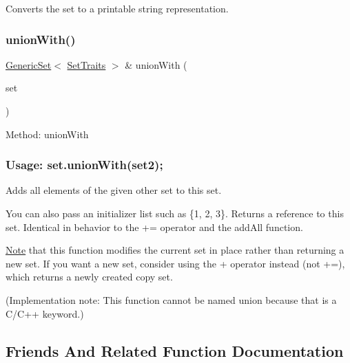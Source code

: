 Converts the set to a printable string representation. 

\mbox{\label{classstanfordcpplib_1_1collections_1_1GenericSet_affa3b4d177e1794dbb3e6a414a5ec2b3}} 
\subsubsection{\texorpdfstring{union\+With()}{unionWith()}}
{\footnotesize\ttfamily \mbox{\hyperlink{classstanfordcpplib_1_1collections_1_1GenericSet}{Generic\+Set}}$<$ \mbox{\hyperlink{structstanfordcpplib_1_1collections_1_1SetTraits}{Set\+Traits}} $>$ \& union\+With (\begin{DoxyParamCaption}\item[{const \mbox{\hyperlink{classstanfordcpplib_1_1collections_1_1GenericSet}{Generic\+Set}}$<$ \mbox{\hyperlink{structstanfordcpplib_1_1collections_1_1SetTraits}{Set\+Traits}} $>$ \&}]{set }\end{DoxyParamCaption})}



Method\+: union\+With \subsubsection*{Usage\+: set.\+union\+With(set2); }

Adds all elements of the given other set to this set. 

You can also pass an initializer list such as \{1, 2, 3\}. Returns a reference to this set. Identical in behavior to the += operator and the add\+All function.

\mbox{\hyperlink{classNote}{Note}} that this function modifies the current set in place rather than returning a new set. If you want a new set, consider using the + operator instead (not +=), which returns a newly created copy set.

(Implementation note\+: This function cannot be named \textquotesingle{}union\textquotesingle{} because that is a C/\+C++ keyword.) 

\subsection{Friends And Related Function Documentation}
\mbox{\label{classstanfordcpplib_1_1collections_1_1GenericSet_a0e54ba06df831323f5a7743ada2de6be}} 
